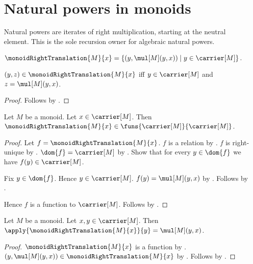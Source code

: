 




\section{Natural powers in monoids}

Natural powers are iterates of right multiplication, starting at the neutral
element.  This is the sole recursion owner for algebraic natural powers.

\begin{definition}\label{monoid_right_translation}
    $\monoidRightTranslation{M}{x}=
        \{(y,\mul[M](y,x))\mid y\in\carrier[M]\}$.
\end{definition}

\begin{proposition}\label{monoid_right_translation_iff}
    $(y,z)\in\monoidRightTranslation{M}{x}$ iff
        $y\in\carrier[M]$ and $z=\mul[M](y,x)$.
\end{proposition}
\begin{proof}
    Follows by
        .
\end{proof}

\begin{proposition}\label{monoid_right_translation_type}
    Let $M$ be a monoid.
    Let $x\in\carrier[M]$.
    Then $\monoidRightTranslation{M}{x}\in
        \funs{\carrier[M]}{\carrier[M]}$.
\end{proposition}
\begin{proof}
    Let $f=\monoidRightTranslation{M}{x}$.
    $f$ is a relation by
        .
    $f$ is right-unique by
        .
    $\dom{f}=\carrier[M]$ by
        .
    Show that for every $y\in\dom{f}$ we have $f(y)\in\carrier[M]$.
    \begin{subproof}
        Fix $y\in\dom{f}$.
        Hence $y\in\carrier[M]$.
        $f(y)=\mul[M](y,x)$ by
            .
        Follows by .
    \end{subproof}
    Hence $f$ is a function to $\carrier[M]$.
    Follows by .
\end{proof}

\begin{proposition}\label{monoid_right_translation_apply}
    Let $M$ be a monoid.
    Let $x,y\in\carrier[M]$.
    Then $\apply{\monoidRightTranslation{M}{x}}{y}=\mul[M](y,x)$.
\end{proposition}
\begin{proof}
    $\monoidRightTranslation{M}{x}$ is a function by
        .
    $(y,\mul[M](y,x))\in\monoidRightTranslation{M}{x}$ by
        .
    Follows by .
\end{proof}

